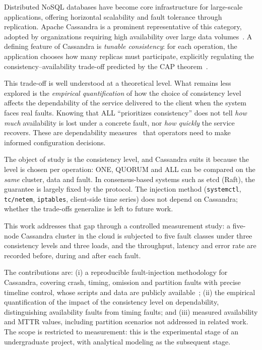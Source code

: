\documentclass[runningheads]{llncs}
\begin{document}
Distributed NoSQL databases have become core infrastructure for large-scale
applications, offering horizontal scalability and fault tolerance through
replication. Apache Cassandra is a prominent representative of this category,
adopted by organizations requiring high availability over large data
volumes~\cite{lakshman2010cassandra}. A defining feature of Cassandra is
\emph{tunable consistency}: for each operation, the application chooses how many
replicas must participate, explicitly regulating the consistency--availability
trade-off predicted by the CAP theorem~\cite{brewer2000cap,gilbert2002cap}.

This trade-off is well understood at a theoretical level. What remains less
explored is the \emph{empirical quantification} of how the choice of consistency
level affects the dependability of the service delivered to the client when the
system faces real faults. Knowing that ALL ``prioritizes consistency'' does not
tell \emph{how much} availability is lost under a concrete fault, nor \emph{how
quickly} the service recovers. These are dependability measures~\cite{avizienis2004basic,meyer1980}
that operators need to make informed configuration decisions.

The object of study is the consistency level, and Cassandra suits it because the
level is chosen per operation: ONE, QUORUM and ALL can be compared on the
\emph{same} cluster, data and fault. In consensus-based systems such as etcd
(Raft), the guarantee is largely fixed by the protocol. The injection method
(\texttt{systemctl}, \texttt{tc/netem}, \texttt{iptables}, client-side time
series) does not depend on Cassandra; whether the trade-offs generalize is left
to future work.

This work addresses that gap through a controlled measurement study: a
five-node Cassandra cluster in the cloud is subjected to five fault classes under
three consistency levels and three loads, and the throughput, latency and error
rate are recorded before, during and after each fault.

The contributions are: (i) a reproducible fault-injection methodology for
Cassandra, covering crash, timing, omission and partition faults with precise
timeline control, whose scripts and data are publicly
available~\cite{artifact}; (ii) the empirical quantification of the impact of the
consistency level on dependability, distinguishing availability faults from
timing faults; and (iii) measured availability and MTTR values, including
partition scenarios not addressed in related work. The scope is restricted to
measurement: this is the experimental stage of an undergraduate project, with
analytical modeling as the subsequent stage.
\end{document}
